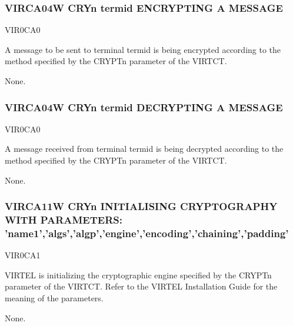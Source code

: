 \documentclass[letterpaper,10pt,english]{sphinxmanual}
\begin{document}
\subsubsection{VIRCA04W CRYn termid ENCRYPTING A MESSAGE}
\label{\detokenize{messages:virca04w-cryn-termid-encrypting-a-message}}\begin{description}
\sphinxAtStartPar
VIR0CA0

\sphinxAtStartPar
A message to be sent to terminal termid is being encrypted according to the method specified by the CRYPTn parameter of the VIRTCT.

\sphinxAtStartPar
None.

\end{description}


\subsubsection{VIRCA04W CRYn termid DECRYPTING A MESSAGE}
\label{\detokenize{messages:virca04w-cryn-termid-decrypting-a-message}}\begin{description}
\sphinxAtStartPar
VIR0CA0

\sphinxAtStartPar
A message received from terminal termid is being decrypted according to the method specified by the CRYPTn parameter of the VIRTCT.

\sphinxAtStartPar
None.

\end{description}


\subsubsection{VIRCA11W CRYn INITIALISING CRYPTOGRAPHY WITH PARAMETERS: ’name1’,’algs’,’algp’,’engine’,’encoding’,’chaining’,’padding’}
\label{\detokenize{messages:virca11w-cryn-initialising-cryptography-with-parameters-name1-algs-algp-engine-encoding-chaining-padding}}\begin{description}
\sphinxAtStartPar
VIR0CA1

\sphinxAtStartPar
VIRTEL is initializing the cryptographic engine specified by the CRYPTn parameter of the VIRTCT. Refer to the VIRTEL Installation Guide for the meaning of the parameters.

\sphinxAtStartPar
None.

\end{description}
\end{document}
